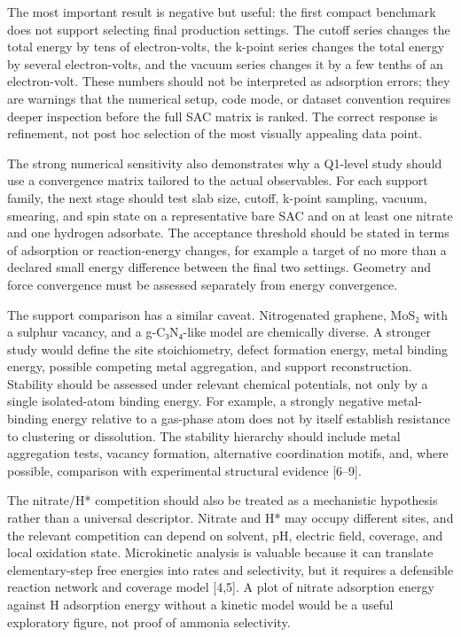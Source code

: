 \documentclass[
]{article}
\begin{document}
The most important result is negative but useful: the first compact
benchmark does not support selecting final production settings. The
cutoff series changes the total energy by tens of electron-volts, the
k-point series changes the total energy by several electron-volts, and
the vacuum series changes it by a few tenths of an electron-volt. These
numbers should not be interpreted as adsorption errors; they are
warnings that the numerical setup, code mode, or dataset convention
requires deeper inspection before the full SAC matrix is ranked. The
correct response is refinement, not post hoc selection of the most
visually appealing data point.

The strong numerical sensitivity also demonstrates why a Q1-level study
should use a convergence matrix tailored to the actual observables. For
each support family, the next stage should test slab size, cutoff,
k-point sampling, vacuum, smearing, and spin state on a representative
bare SAC and on at least one nitrate and one hydrogen adsorbate. The
acceptance threshold should be stated in terms of adsorption or
reaction-energy changes, for example a target of no more than a declared
small energy difference between the final two settings. Geometry and
force convergence must be assessed separately from energy convergence.

The support comparison has a similar caveat. Nitrogenated graphene, MoS₂
with a sulphur vacancy, and a g-C₃N₄-like model are chemically diverse.
A stronger study would define the site stoichiometry, defect formation
energy, metal binding energy, possible competing metal aggregation, and
support reconstruction. Stability should be assessed under relevant
chemical potentials, not only by a single isolated-atom binding energy.
For example, a strongly negative metal-binding energy relative to a
gas-phase atom does not by itself establish resistance to clustering or
dissolution. The stability hierarchy should include metal aggregation
tests, vacancy formation, alternative coordination motifs, and, where
possible, comparison with experimental structural evidence {[}6--9{]}.

The nitrate/H* competition should also be treated as a mechanistic
hypothesis rather than a universal descriptor. Nitrate and H* may occupy
different sites, and the relevant competition can depend on solvent, pH,
electric field, coverage, and local oxidation state. Microkinetic
analysis is valuable because it can translate elementary-step free
energies into rates and selectivity, but it requires a defensible
reaction network and coverage model {[}4,5{]}. A plot of nitrate
adsorption energy against H adsorption energy without a kinetic model
would be a useful exploratory figure, not proof of ammonia selectivity.
\end{document}
